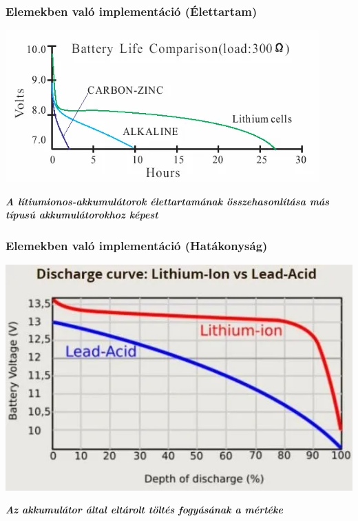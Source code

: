 \documentclass{beamer}
\begin{document}
\begin{frame}
\frametitle{Elemekben való implementáció (Élettartam)}
\begin{center}
	\includegraphics[scale=0.5]{batterylife}
\end{center}
\begin{center}
	\textbf{\textit{A lítiumionos-akkumulátorok élettartamának összehasonlítása más típusú akkumulátorokhoz képest}}
\end{center}
\end{frame}

\begin{frame}
\frametitle{Elemekben való implementáció (Hatákonyság)}
\begin{center}
	\includegraphics[scale=0.4]{discharge}
\end{center}
\begin{center}
	\textbf{\textit{Az akkumulátor által eltárolt töltés fogyásának a mértéke}}
\end{center}
\end{frame}
\end{document}
